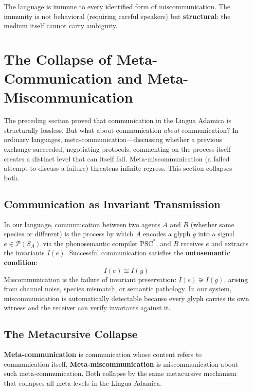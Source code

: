 \documentclass[12pt, letterpaper]{book}
\def\mathfrak#1{#1}%
\begin{document}
The language is immune to every identified form of miscommunication. The immunity is not behavioral (requiring careful speakers) but \textbf{structural}: the medium itself cannot carry ambiguity.

\section[Meta-Communication Collapse]{The Collapse of Meta-Communication and Meta-Miscommunication}

The preceding section proved that communication in the Lingua Adamica is structurally lossless. But what about communication \textit{about} communication? In ordinary languages, meta-communication---discussing whether a previous exchange succeeded, negotiating protocols, commenting on the process itself---creates a distinct level that can itself fail. Meta-miscommunication (a failed attempt to discuss a failure) threatens infinite regress. This section collapses both.

\subsection{Communication as Invariant Transmission}

In our language, communication between two agents $A$ and $B$ (whether same species or different) is the process by which $A$ encodes a glyph $\mathfrak{g}$ into a signal $e \in \mathcal{P}(S_A)$ via the phonosemantic compiler $\mathrm{PSC}^*$, and $B$ receives $e$ and extracts the invariants $I(e)$. Successful communication satisfies the \textbf{ontosemantic condition}:
\[
I(e) \cong I(\mathfrak{g})
\]
Miscommunication is the failure of invariant preservation: $I(e) \not\cong I(\mathfrak{g})$, arising from channel noise, species mismatch, or semantic pathology. In our system, miscommunication is automatically detectable because every glyph carries its own witness and the receiver can verify invariants against it.

\subsection{The Metacursive Collapse}

\textbf{Meta-communication} is communication whose content refers to communication itself. \textbf{Meta-miscommunication} is miscommunication about such meta-communication. Both collapse by the same metacursive mechanism that collapses all meta-levels in the Lingua Adamica.
\end{document}

